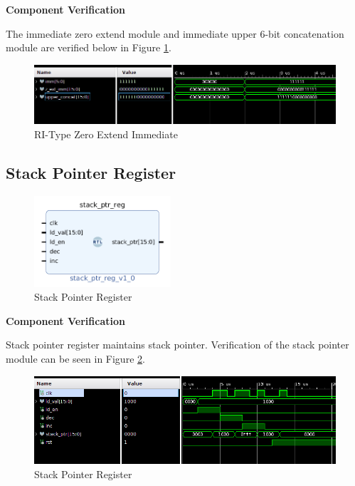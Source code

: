 \documentclass{article}
\newcommand{\stitle}{Component Verification}
\begin{document}
\begin{par}
	\textbf{\stitle}
	\begin{par}
		The immediate zero extend module and immediate upper 6-bit concatenation module are verified below in Figure \ref{fig:ri_imm_tb}. 
	\end{par}

	\begin{figure}[H]
		\centering
		\includegraphics[width=7in]{img/riExtTB.png}
		\caption{RI-Type Zero Extend Immediate}
		\label{fig:ri_imm_tb}
	\end{figure}

	\newpage
	
	\subsection{Stack Pointer Register}
	
	\begin{figure}[H]
		\centering
		\includegraphics[width=2in]{img/stackPtr.png}
		\caption{Stack Pointer Register}
	\end{figure}

	\textbf{\stitle}
	\begin{par}
		Stack pointer register maintains stack pointer. Verification of the stack pointer module can be seen in Figure \ref{fig:stackPtrTB}.
	\end{par}

	\begin{figure}[H]
		\centering
		\includegraphics[width=7in]{img/stackPtrTB.png}
		\caption{Stack Pointer Register}
		\label{fig:stackPtrTB}
	\end{figure}

\end{par}

\newpage
\end{document}
